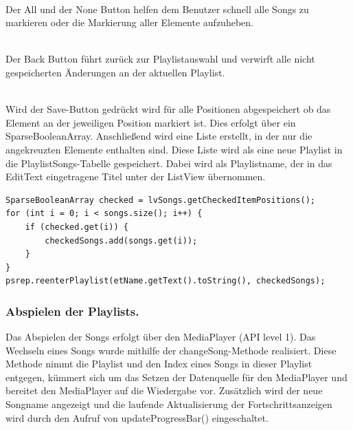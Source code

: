\documentclass[FIPLY_base.tex]{subfiles}
\begin{document}
\ \\
Der All und der None Button helfen dem Benutzer schnell alle Songs zu markieren oder die Markierung aller Elemente aufzuheben.

\ \\
Der Back Button führt zurück zur Playlistauswahl und verwirft alle nicht gespeicherten Änderungen an der aktuellen Playlist.

\ \\
Wird der Save-Button gedrückt wird für alle Positionen abgespeichert ob das Element an der jeweiligen Position markiert ist. Dies erfolgt über ein SparseBooleanArray. 
Anschließend wird eine Liste erstellt, in der nur die angekreuzten Elemente enthalten sind. Diese Liste wird als eine neue Playlist in die PlaylistSongs-Tabelle gespeichert. 
Dabei wird als Playlistname, der in das EditText eingetragene Titel unter der ListView übernommen.

\begin{lstlisting}[caption={Speichern der Songverweise in eine ArrayList von HashMaps},label=DescriptiveLabel]
SparseBooleanArray checked = lvSongs.getCheckedItemPositions();
for (int i = 0; i < songs.size(); i++) {
    if (checked.get(i)) {
        checkedSongs.add(songs.get(i));
    }
}
psrep.reenterPlaylist(etName.getText().toString(), checkedSongs);
\end{lstlisting}


\subsubsection {Abspielen der Playlists.}
Das Abspielen der Songs erfolgt über den MediaPlayer (API level 1). \newline
Das Wechseln eines Songs wurde mithilfe der changeSong-Methode realisiert. \newline
Diese Methode nimmt die Playlist und den Index eines Songs in dieser Playlist entgegen, kümmert sich um das Setzen der Datenquelle für den MediaPlayer und bereitet den MediaPlayer auf die Wiedergabe vor. 
Zusätzlich wird der neue Songname angezeigt und die laufende Aktualisierung der Fortschrittsanzeigen wird durch den Aufruf von updateProgressBar() eingeschaltet. 
\end{document}
